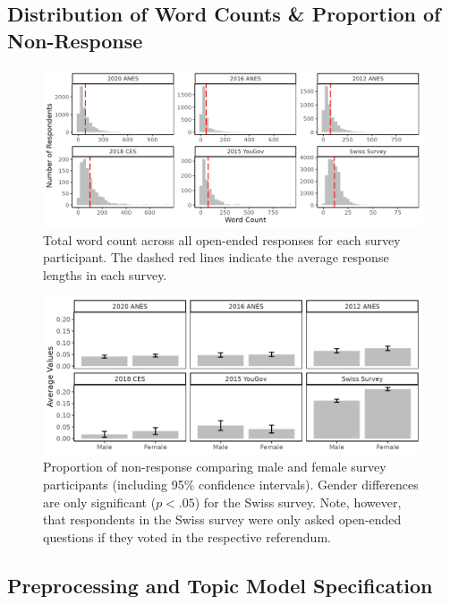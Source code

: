 \subsection{Distribution of Word Counts \& Proportion of Non-Response}
\begin{figure}[ht]\centering
	\includegraphics{../fig/wc.png}
	\caption[Total word count across all open-ended responses]{Total word count across all open-ended responses for each survey participant. The dashed red lines indicate the average response lengths in each survey.}\label{fig:wc}
\end{figure}

\begin{figure}[ht]\centering
	\includegraphics{../fig/noresponse.png}
	\caption{Proportion of non-response comparing male and female survey participants (including 95\% confidence intervals). Gender differences are only significant ($p<.05$) for the Swiss survey. Note, however, that respondents in the Swiss survey were only asked open-ended questions if they voted in the respective referendum.}
\end{figure}


\clearpage
\subsection{Preprocessing and Topic Model Specification}

